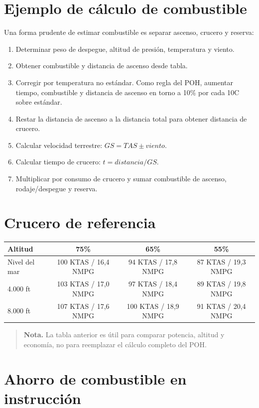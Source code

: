 \documentclass[11pt,oneside]{book}
\newcommand{\note}[1]{\begin{quote}\small\textbf{Nota.} #1\end{quote}}
\begin{document}
\section{Ejemplo de cálculo de combustible}

Una forma prudente de estimar combustible es separar ascenso, crucero y reserva:

\begin{enumerate}
\item Determinar peso de despegue, altitud de presión, temperatura y viento.
\item Obtener combustible y distancia de ascenso desde tabla.
\item Corregir por temperatura no estándar. Como regla del POH, aumentar tiempo, combustible y distancia de ascenso en torno a 10\% por cada 10\textdegree C sobre estándar.
\item Restar la distancia de ascenso a la distancia total para obtener distancia de crucero.
\item Calcular velocidad terrestre: \(GS = TAS \pm viento\).
\item Calcular tiempo de crucero: \(t = distancia / GS\).
\item Multiplicar por consumo de crucero y sumar combustible de ascenso, rodaje/despegue y reserva.
\end{enumerate}

\section{Crucero de referencia}

\begin{tabularx}{\textwidth}{@{}p{}ccc@{}}
\toprule
\textbf{Altitud} & \textbf{75\%} & \textbf{65\%} & \textbf{55\%} \\
\midrule
Nivel del mar & 100 KTAS / 16,4 NMPG & 94 KTAS / 17,8 NMPG & 87 KTAS / 19,3 NMPG \\
4.000 ft & 103 KTAS / 17,0 NMPG & 97 KTAS / 18,4 NMPG & 89 KTAS / 19,8 NMPG \\
8.000 ft & 107 KTAS / 17,6 NMPG & 100 KTAS / 18,9 NMPG & 91 KTAS / 20,4 NMPG \\
\bottomrule
\end{tabularx}

\note{La tabla anterior es útil para comparar potencia, altitud y economía, no para reemplazar el cálculo completo del POH.}

\section{Ahorro de combustible en instrucción}
\end{document}
